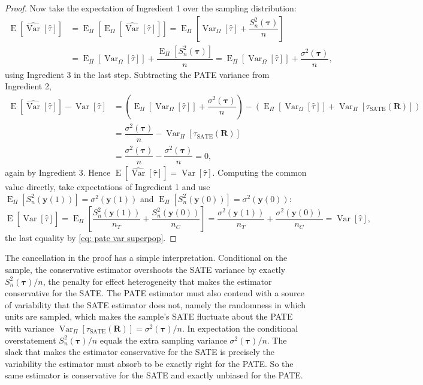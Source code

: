 \documentclass[12pt,leqno]{article}
\theoremstyle{newstyle}
\DeclareMathOperator{\E}{\mathrm{E}}
\DeclareMathOperator{\Var}{\mathrm{Var}}
\newcommand{\bR}{\bm{R}}   \newcommand{\br}{\bm{r}}   %
\newcommand{\EZ}{\E_{\Omega}}    \newcommand{\VarZ}{\Var_{\Omega}}  %
\newcommand{\ER}{\E_{\Pi}}       \newcommand{\VarR}{\Var_{\Pi}}     %
\newcommand{\pov}[1]{\bm{y}(#1)}    %
\newcommand{\tauS}{\tau_{\text{SATE}}}
\newcommand{\tauhat}{\hat{\tau}}
\newcommand{\Ssq}[2][n]{S_{#1}^{2}(#2)}
\newcommand{\ssq}[2][n]{\sigma_{#1}^{2}(#2)}
\newcommand{\Varhat}{\widehat{\Var}}
\begin{document}
\begin{proof}
Now take the expectation of Ingredient 1 over the sampling distribution:
\small
\begin{align*}
\E\left[\Varhat\left[\tauhat\right]\right] & = \ER\left[\EZ\left[\Varhat\left[\tauhat\right]\right]\right] = \ER\left[\VarZ\left[\tauhat\right] + \dfrac{\Ssq{\bm{\tau}}}{n}\right] \\
& = \ER\left[\VarZ\left[\tauhat\right]\right] + \dfrac{\ER\left[\Ssq{\bm{\tau}}\right]}{n} = \ER\left[\VarZ\left[\tauhat\right]\right] + \dfrac{\ssq[]{\bm{\tau}}}{n},
\end{align*}
\normalsize
using Ingredient 3 in the last step. Subtracting the PATE variance from Ingredient 2,
\small
\begin{align*}
\E\left[\Varhat\left[\tauhat\right]\right] - \Var\left[\tauhat\right] & = \left(\ER\left[\VarZ\left[\tauhat\right]\right] + \dfrac{\ssq[]{\bm{\tau}}}{n}\right) - \left(\ER\left[\VarZ\left[\tauhat\right]\right] + \VarR\left[\tauS(\bR)\right]\right) \\[1ex]
& = \dfrac{\ssq[]{\bm{\tau}}}{n} - \VarR\left[\tauS(\bR)\right] \\[1ex]
& = \dfrac{\ssq[]{\bm{\tau}}}{n} - \dfrac{\ssq[]{\bm{\tau}}}{n} = 0,
\end{align*}
\normalsize
again by Ingredient 3. Hence $\E[\Varhat[\tauhat]] = \Var[\tauhat]$. Computing the common value directly, take expectations of Ingredient 1 and use $\ER[\Ssq{\pov{1}}] = \ssq[]{\pov{1}}$ and $\ER[\Ssq{\pov{0}}] = \ssq[]{\pov{0}}$:
\small
\begin{equation*}
\E\left[\Varhat\left[\tauhat\right]\right] = \ER\left[\dfrac{\Ssq{\pov{1}}}{n_T} + \dfrac{\Ssq{\pov{0}}}{n_C}\right] = \dfrac{\ssq[]{\pov{1}}}{n_T} + \dfrac{\ssq[]{\pov{0}}}{n_C} = \Var\left[\tauhat\right],
\end{equation*}
\normalsize
the last equality by \eqref{eq: pate var superpop}.
\end{proof}

The cancellation in the proof has a simple interpretation. Conditional on the sample, the conservative estimator overshoots the SATE variance by exactly $\Ssq{\bm{\tau}}/n$, the penalty for effect heterogeneity that makes the estimator conservative for the SATE. The PATE estimator must also contend with a source of variability that the SATE estimator does not, namely the randomness in which units are sampled, which makes the sample's SATE fluctuate about the PATE with variance $\VarR[\tauS(\bR)] = \ssq[]{\bm{\tau}}/n$. In expectation the conditional overstatement $\Ssq{\bm{\tau}}/n$ equals the extra sampling variance $\ssq[]{\bm{\tau}}/n$. The slack that makes the estimator conservative for the SATE is precisely the variability the estimator must absorb to be exactly right for the PATE. So the same estimator is conservative for the SATE and exactly unbiased for the PATE.
\end{document}
